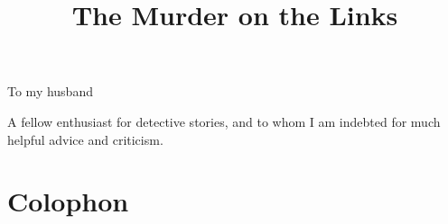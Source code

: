 \documentclass[
paper=5.5in:8.5in,
]{scrbook} %
\title{The Murder on the Links}
\begin{document}
\frontmatter

\pagestyle{plain}
\tableofcontents
\clearpage

\chapter*{}
\vspace*{5em}
{\Large\noindent To my husband\\
}
\vspace*{2em}

{\large\noindent A fellow enthusiast for detective stories, and to whom I am indebted for much helpful advice and criticism.}
\vfill
\thispagestyle{empty}

\mainmatter
\pagestyle{headings}
\renewcommand*{\chapterpagestyle}{plain}



































\clearpage
{}
\chapter*{Colophon}
\end{document}
